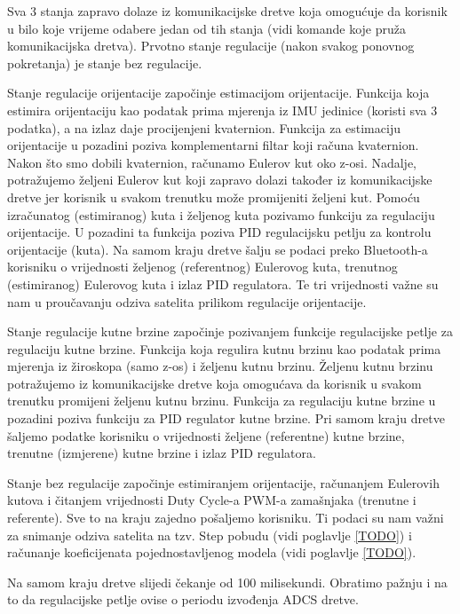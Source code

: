 \documentclass[times, utf8, diplomski, numeric]{templates/template}
\begin{document}
{{{{                Sva 3 stanja zapravo dolaze iz komunikacijske dretve koja omogućuje da korisnik u bilo koje vrijeme odabere jedan od tih stanja (vidi komande koje pruža komunikacijska dretva). Prvotno stanje regulacije (nakon svakog ponovnog pokretanja) je stanje bez regulacije.

                Stanje regulacije orijentacije započinje estimacijom orijentacije. Funkcija koja estimira orijentaciju kao podatak prima mjerenja iz IMU jedinice (koristi sva 3 podatka), a na izlaz daje procijenjeni kvaternion. Funkcija za estimaciju orijentacije u pozadini poziva komplementarni filtar koji računa kvaternion. Nakon što smo dobili kvaternion, računamo Eulerov kut oko z-osi. Nadalje, potražujemo željeni Eulerov kut koji zapravo dolazi također iz komunikacijske dretve jer korisnik u svakom trenutku može promijeniti željeni kut. Pomoću izračunatog (estimiranog) kuta i željenog kuta pozivamo funkciju za regulaciju orijentacije. U pozadini ta funkcija poziva PID regulacijsku petlju za kontrolu orijentacije (kuta). Na samom kraju dretve šalju se podaci preko Bluetooth-a korisniku o vrijednosti željenog (referentnog) Eulerovog kuta, trenutnog (estimiranog) Eulerovog kuta i izlaz PID regulatora. Te tri vrijednosti važne su nam u proučavanju odziva satelita prilikom regulacije orijentacije. 

                Stanje regulacije kutne brzine započinje pozivanjem funkcije regulacijske petlje za regulaciju kutne brzine. Funkcija koja regulira kutnu brzinu kao podatak prima mjerenja iz žiroskopa (samo z-os) i željenu kutnu brzinu. Željenu kutnu brzinu potražujemo iz komunikacijske dretve koja omogućava da korisnik u svakom trenutku promijeni željenu kutnu brzinu. Funkcija za regulaciju kutne brzine u pozadini poziva funkciju za PID regulator kutne brzine. Pri samom kraju dretve šaljemo podatke korisniku o vrijednosti željene (referentne) kutne brzine, trenutne (izmjerene) kutne brzine i izlaz PID regulatora. 

                Stanje bez regulacije započinje estimiranjem orijentacije, računanjem Eulerovih kutova i čitanjem vrijednosti Duty Cycle-a PWM-a zamašnjaka (trenutne i referente). Sve to na kraju zajedno pošaljemo korisniku. Ti podaci su nam važni za snimanje odziva satelita na tzv. Step pobudu (vidi poglavlje \ref{TODO}) i računanje koeficijenata pojednostavljenog modela (vidi poglavlje \ref{TODO}).

                Na samom kraju dretve slijedi čekanje od 100 milisekundi. Obratimo pažnju i na to da regulacijske petlje ovise o periodu izvođenja ADCS dretve.
            }

}}}
\end{document}
